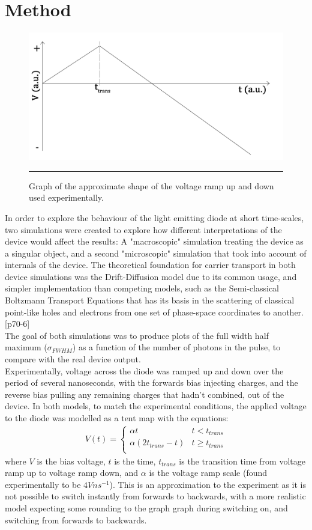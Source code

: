 \documentclass[titlepage]{article}
\begin{document}
\section{Method}\label{sec:Method}
\begin{figure}[H]
	\centering
	\includegraphics[scale=0.12]{Figures/V_tent}
	\caption{\label{graph:V_tent}Graph of the approximate shape of the voltage ramp up and down used experimentally.}
	\hrule
\end{figure}
In order to explore the behaviour of the light emitting diode at short time-scales, two simulations were created to explore how different interpretations of the device would affect the results: A "macroscopic" simulation treating the device as a singular object, and a second "microscopic" simulation that took into account of internals of the device. The theoretical foundation for carrier transport in both device simulations was the Drift-Diffusion model due to its common usage, and simpler implementation than competing models, such as the Semi-classical Boltzmann Transport Equations that has its basis in the scattering of classical point-like holes and electrons from one set of phase-space coordinates to another.\cite{NSD}[p70-6] \\
The goal of both simulations was to produce plots of the full width half maximum ($\sigma_{FWHM}$) as a function of the number of photons in the pulse, to compare with the real device output.\\
Experimentally, voltage across the diode was ramped up and down over the period of several nanoseconds, with the forwards bias injecting charges, and the reverse bias pulling any remaining charges that hadn't combined, out of the device. In both models, to match the experimental conditions, the applied voltage to the diode was modelled as a tent map with the equations:
\begin{eqnarray}
	V(t) = \begin{cases}
	\alpha t &t < t_{trans}\\
	\alpha(2t_{trans} - t) &t \geq t_{trans}\\
	\end{cases}
\end{eqnarray}
where $V$ is the bias voltage, $t$ is the time, $t_{trans}$ is the transition time from voltage ramp up to voltage ramp down, and $\alpha$ is the voltage ramp scale (found experimentally to be $4Vns^{-1}$). This is an approximation to the experiment as it is not possible to switch instantly from forwards to backwards, with a more realistic model expecting some rounding to the graph graph during switching on, and switching from forwards to backwards. 
\end{document}
